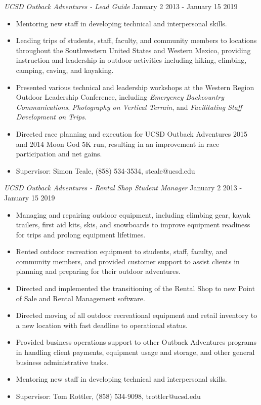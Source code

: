 \documentclass[line,margin]{res}
\begin{document}
\begin{resume}
	{\sl UCSD Outback Adventures - Lead Guide} \hfill January 2 2013 - January 15 2019
	\begin{itemize}
		\item Mentoring new staff in developing technical and interpersonal skills.
		\item Leading trips of students, staff, faculty, and community members to locations throughout the Southwestern United States and Western Mexico, providing instruction and leadership in outdoor activities including hiking, climbing, camping, caving, and kayaking.
		\item Presented various technical and leadership workshops at the Western Region Outdoor Leadership Conference, including \textit{Emergency Backcountry Communications}, \textit{Photography on Vertical Terrain}, and \textit{Facilitating Staff Development on Trips}.
		\item Directed race planning and execution for UCSD Outback Adventures 2015 and 2014 Moon God 5K run, resulting in an improvement in race participation and net gains.
		\item Supervisor: Simon Teale, (858) 534-3534, steale@ucsd.edu
	\end{itemize}
	{\sl UCSD Outback Adventures - Rental Shop Student Manager} \hfill January 2 2013 - January 15 2019
	\begin{itemize}
		\item Managing and repairing outdoor equipment, including climbing gear, kayak trailers, first aid kits, skis, and snowboards to improve equipment readiness for trips and prolong equipment lifetimes.
		\item Rented outdoor recreation equipment to students, staff, faculty, and community members, and provided customer support to assist clients in planning and preparing for their outdoor adventures.
		\item Directed and implemented the transitioning of the Rental Shop to new Point of Sale and Rental Management software.
		\item Directed moving of all outdoor recreational equipment and retail inventory to a new location with fast deadline to operational status.
		\item Provided business operations support to other Outback Adventures programs in handling client payments, equipment usage and storage, and other general business administrative tasks.
		\item Mentoring new staff in developing technical and interpersonal skills.
		\item Supervisor: Tom Rottler, (858) 534-9098, trottler@ucsd.edu
	\end{itemize}


\end{resume}
\end{document}
